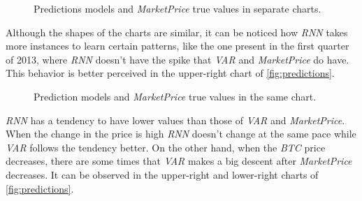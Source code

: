 \begin{figure}[bth] 
  \caption{Predictions models and \textit{MarketPrice} true values in
separate charts.}
  \label{fig:predictions-subplots}
\end{figure}

Although the shapes of the charts are similar, it can be noticed how
\textit{RNN} takes more instances to learn certain patterns, like the
one present in the first quarter of 2013, where \textit{RNN} doesn't
have the spike that \textit{VAR} and \textit{MarketPrice} do have.
This behavior is better perceived in the upper-right chart of
\autoref{fig:predictions}.

\begin{figure}[bth]
  \caption{Prediction models and \textit{MarketPrice} true values in
    the same chart.}
  \label{fig:predictions}
\end{figure}

\textit{RNN} has a tendency to have lower values than those of
\textit{VAR} and \textit{MarketPrice}. When the change in the price is
high \textit{RNN} doesn't change at the same pace while \textit{VAR}
follows the tendency better. On the other hand, when the \textit{BTC}
price decreases, there are some times that \textit{VAR} makes a big
descent after \textit{MarketPrice} decreases. It can be observed in
the upper-right and lower-right charts of \autoref{fig:predictions}.

